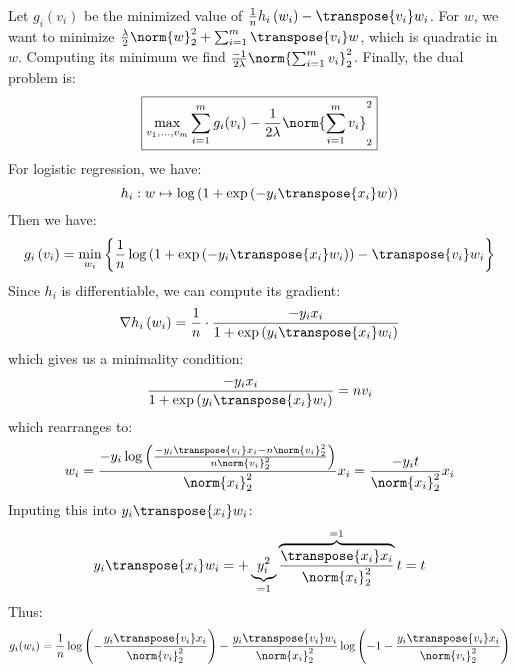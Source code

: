 \documentclass[math, info]{cours}
\begin{document}
\begin{itemize}
		Let $g_{i}\left( v_{i} \right)$ be the minimized value of $\frac{1}{n}h_{i}\left( w_{i} \right) - \transpose{v_{i}}w_{i}$.
		For $w$, we want to minimize $\frac{\lambda}{2}\norm{w}_{2}^{2} + \sum_{i = 1}^{m}\transpose{v_{i}}w$,
		which is quadratic in $w$.
		Computing its minimum we find $\frac{-1}{2\lambda}\norm{\sum_{i = 1}^{m}v_{i}}_{2}^{2}$.
		Finally, the dual problem is:
		\begin{equation*}
			\boxed{\max_{v_{1},\ldots, v_{m}}\sum_{i = 1}^{m}g_{i}(v_{i}) - \frac{1}{2\lambda}\norm{\sum_{i = 1}^{m}v_{i}}_{2}^{2}}
		\end{equation*}
		For logistic regression, we have:
		\begin{equation*}
			h_{i}: w\mapsto \log\left( 1 + \exp \left( -y_{i}\transpose{x_{i}}w \right) \right)
		\end{equation*}
		Then we have:
		\begin{equation*}
			g_{i}\left( v_{i} \right) = \min_{w_{i}} \left\{ \frac{1}{n}\log\left( 1 + \exp\left( -y_{i}\transpose{x_{i}}w_{i} \right) \right) - \transpose{v_{i}}w_{i} \right\}
		\end{equation*}
		Since $h_{i}$ is differentiable, we can compute its gradient:
		\begin{equation*}
			\nabla h_{i}\left( w_{i} \right) = \frac{1}{n}\cdot \frac{-y_{i}x_{i}}{1 + \exp\left( y_{i}\transpose{x_{i}}w_{i} \right)}
		\end{equation*}
		which gives us a minimality condition:
		\begin{equation*}
			\frac{-y_{i}x_{i}}{1 + \exp\left( y_{i}\transpose{x_{i}}w_{i} \right)} = nv_{i}
		\end{equation*}
		which rearranges to:
		\begin{equation*}
		w_{i} = \frac{
			-y_{i}\log\left(
				\frac{-y_{i}\transpose{v_{i}}x_{i} - n\norm{v_{i}}_{2}^{2}}
				     {n\norm{v_{i}}_{2}^{2}}
	     		\right)}
		{
			\norm{x_{i}}_{2}^{2}
		}x_{i} = \frac{-y_{i}t}{\norm{x_{i}}_{2}^{2}}x_{i}
		\end{equation*}
		Inputing this into $y_{i}\transpose{x_{i}}w_{i}$:
		\begin{equation*}
			y_{i}\transpose{x_{i}}w_{i} = +\underbrace{y_{i}^{2}}_{=1} \overbrace{\frac{\transpose{x_{i}}x_{i}}{\norm{x_{i}}_{2}^{2}}}^{=1} t = t
		\end{equation*}
		Thus:
		\begin{equation*}
			g_{i}(w_{i}) = \frac{1}{n} \log\left( -\frac{y_{i}\transpose{v_{i}}x_{i}}{\norm{v_{i}}_{2}^{2}} \right)- \frac{y_{i}\transpose{v_{i}}w_{i}}{\norm{x_{i}}_{2}^{2}}\log\left( -1 - \frac{y_{i}\transpose{v_{i}}x_{i}}{\norm{v_{i}}_{2}^{2}} \right)

\end{equation*}
\end{itemize}
\end{document}
